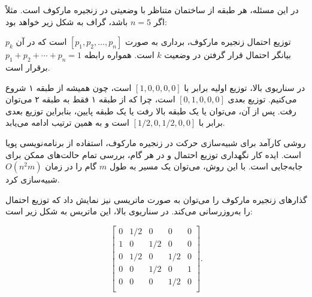 در این مسئله، هر طبقه از ساختمان متناظر با وضعیتی در زنجیره مارکوف است.
مثلاً اگر $n=5$ باشد، گراف به شکل زیر خواهد بود:

\begin{center}
\end{center}

توزیع احتمال زنجیره مارکوف، برداری به صورت
$[p_1,p_2,\ldots,p_n]$ است که در آن $p_k$ بیانگر
احتمال قرار گرفتن در وضعیت $k$ است.
همواره رابطه $p_1+p_2+\cdots+p_n=1$ برقرار است.

در سناریوی بالا، توزیع اولیه برابر با
$[1,0,0,0,0]$ است، چون همیشه از طبقه ۱ شروع می‌کنیم.
توزیع بعدی $[0,1,0,0,0]$ است،
چرا که از طبقه ۱ فقط به طبقه ۲ می‌توان رفت.
پس از آن، می‌توان یا یک طبقه بالا رفت یا یک طبقه پایین،
بنابراین توزیع بعدی برابر با $[1/2,0,1/2,0,0]$ است و به همین ترتیب ادامه می‌یابد.

روشی کارآمد برای شبیه‌سازی حرکت در زنجیره مارکوف، استفاده از برنامه‌نویسی پویا است.
ایده کار نگهداری توزیع احتمال
و در هر گام، بررسی تمام حالت‌های ممکن برای جابه‌جایی است.
با این روش، می‌توان یک مسیر به طول $m$ گام را در زمان $O(n^2 m)$ شبیه‌سازی کرد.

گذارهای زنجیره مارکوف را می‌توان به صورت ماتریسی
نیز نمایش داد که توزیع احتمال را به‌روزرسانی می‌کند.
در سناریوی بالا، این ماتریس به شکل زیر است:

\[ 
 \begin{bmatrix}
  0 & 1/2 & 0 & 0 & 0 \\
  1 & 0 & 1/2 & 0 & 0 \\
  0 & 1/2 & 0 & 1/2 & 0 \\
  0 & 0 & 1/2 & 0 & 1 \\
  0 & 0 & 0 & 1/2 & 0 \\
 \end{bmatrix}.
\]

